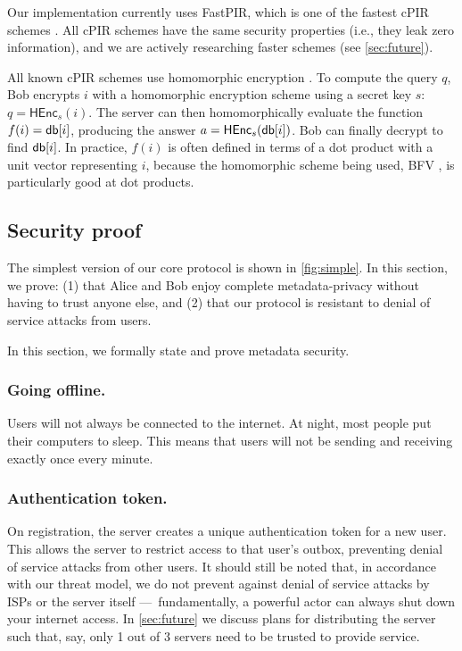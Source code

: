 Our implementation currently uses FastPIR, which is one of the fastest cPIR schemes \cite{ahmad2021addra}. All cPIR schemes have the same security properties (i.e., they leak zero information), and we are actively researching faster schemes (see \cref{sec:future}).

All known cPIR schemes use homomorphic encryption \cite{gentry2010computing}. To compute the query $q$, Bob encrypts $i$ with a homomorphic encryption scheme using a secret key $s$: $q = \mathsf{HEnc}_s(i)$. The server can then homomorphically evaluate the function $f(i) = \mathsf{db}[i]$, producing the answer $a = \mathsf{HEnc}_s(\mathsf{db}[i])$. Bob can finally decrypt to find $\mathsf{db}[i]$. In practice, $f(i)$ is often defined in terms of a dot product with a unit vector representing $i$, because the homomorphic scheme being used, BFV \cite{fan2012somewhat}, is particularly good at dot products.

\subsection{Security proof}

The simplest version of our core protocol is shown in \cref{fig:simple}. In this section, we prove: (1) that Alice and Bob enjoy complete metadata-privacy without having to trust anyone else, and (2) that our protocol is resistant to denial of service attacks from users.

In this section, we formally state and prove metadata security.


\subsubsection{Going offline.} Users will not always be connected to the internet. At night, most people put their computers to sleep. This means that users will not be sending and receiving exactly once every minute. 

\subsubsection{Authentication token.} 
On registration, the server creates a unique authentication token for a new user. This allows the server to restrict access to that user's outbox, preventing denial of service attacks from other users. It should still be noted that, in accordance with our threat model, we do not prevent against denial of service attacks by ISPs or the server itself — fundamentally, a powerful actor can always shut down your internet access. In \cref{sec:future} we discuss plans for distributing the server such that, say, only 1 out of 3 servers need to be trusted to provide service.


